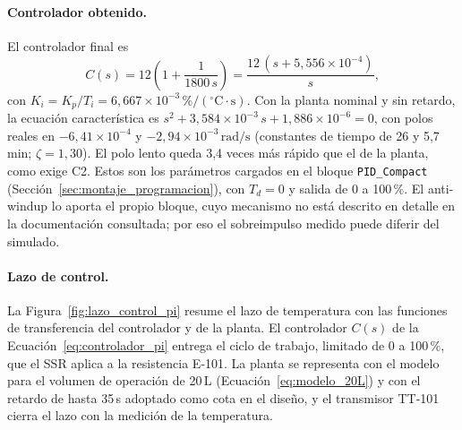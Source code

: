 \paragraph{Controlador obtenido.} El controlador final es
\begin{equation}
C(s) = 12\left(1 + \frac{1}{1800\,s}\right) = \frac{12\,(s + 5{,}556 \times 10^{-4})}{s},
\label{eq:controlador_pi}
\end{equation}
con $K_i = K_p/T_i = 6{,}667 \times 10^{-3}\,\%/(^{\circ}\mathrm{C}\cdot\mathrm{s})$. Con la planta nominal y sin retardo, la ecuación característica es $s^2 + 3{,}584 \times 10^{-3}\,s + 1{,}886 \times 10^{-6} = 0$, con polos reales en $-6{,}41 \times 10^{-4}$ y $-2{,}94 \times 10^{-3}\,\mathrm{rad/s}$ (constantes de tiempo de 26 y 5,7\,min; $\zeta = 1{,}30$). El polo lento queda 3,4 veces más rápido que el de la planta, como exige C2. Estos son los parámetros cargados en el bloque \texttt{PID\_Compact} (Sección~\ref{sec:montaje_programacion}), con $T_d = 0$ y salida de 0 a 100\,\%. El anti-windup lo aporta el propio bloque, cuyo mecanismo no está descrito en detalle en la documentación consultada; por eso el sobreimpulso medido puede diferir del simulado.

\paragraph{Lazo de control.} La Figura~\ref{fig:lazo_control_pi} resume el lazo de temperatura con las funciones de transferencia del controlador y de la planta. El controlador $C(s)$ de la Ecuación~\eqref{eq:controlador_pi} entrega el ciclo de trabajo, limitado de 0 a 100\,\%, que el SSR aplica a la resistencia E-101. La planta se representa con el modelo para el volumen de operación de 20\,L (Ecuación~\eqref{eq:modelo_20L}) y con el retardo de hasta 35\,s adoptado como cota en el diseño, y el transmisor TT-101 cierra el lazo con la medición de la temperatura.


